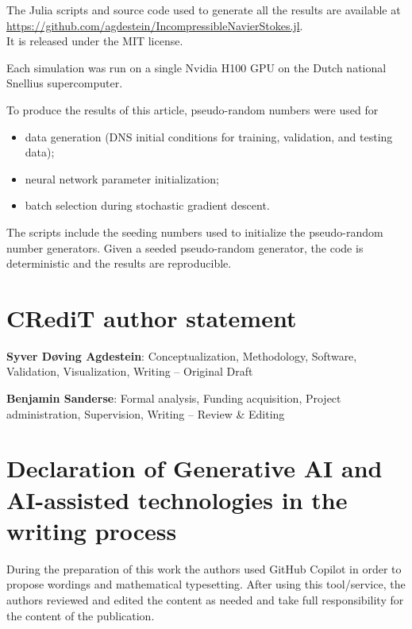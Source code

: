 \documentclass[preprint]{elsarticle}
\newcommand{\revtwo}[1]{#1}
\begin{document}
The Julia scripts and source code used to generate all the results are
available at \\
\url{https://github.com/agdestein/IncompressibleNavierStokes.jl}. \\
It is released under the MIT license.
\revtwo{
    
    Each simulation was run on a single Nvidia H100 GPU
    on the Dutch national Snellius supercomputer.
}

To produce the results of this article, pseudo-random numbers were used for
\begin{itemize}
    \item data generation (DNS initial conditions for training, validation, and
        testing data);
    \item neural network parameter initialization;
    \item batch selection during stochastic gradient descent.
\end{itemize}
The scripts include the seeding numbers used to initialize the pseudo-random
number generators. Given a seeded pseudo-random generator, the code is
deterministic and the results are reproducible.

\section*{CRediT author statement}


\textbf{Syver Døving Agdestein}:
Conceptualization,
Methodology,
Software,
Validation,
Visualization,
Writing -- Original Draft

\textbf{Benjamin Sanderse}:
Formal analysis,
Funding acquisition,
Project administration,
Supervision,
Writing -- Review \& Editing

\section*{Declaration of Generative AI and AI-assisted technologies in the writing process}


During the preparation of this work the authors used GitHub Copilot in order to
propose wordings and mathematical typesetting. After using this tool/service,
the authors reviewed and edited the content as needed and take full
responsibility for the content of the publication.
\end{document}
